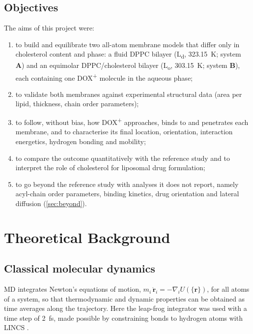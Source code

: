 \documentclass[11pt,a4paper]{article}
\newcommand{\dox}{DOX\textsuperscript{+}}
\newcommand{\sysA}{\textcolor{sysA}{\textbf{A}}}
\newcommand{\sysB}{\textcolor{sysB}{\textbf{B}}}
\newcommand{\Ld}{L\textsubscript{d}}
\newcommand{\Lo}{L\textsubscript{o}}
\begin{document}
\subsection{Objectives}
The aims of this project were:
\begin{enumerate}[label=\arabic*.]
  \item to build and equilibrate two all-atom membrane models that differ only in cholesterol content
        and phase: a fluid DPPC bilayer (\Ld, \SI{323.15}{K}; system \sysA) and an equimolar
        DPPC/cholesterol bilayer (\Lo, \SI{303.15}{K}; system \sysB), each containing one \dox{} molecule
        in the aqueous phase;
  \item to validate both membranes against experimental structural data (area per lipid, thickness,
        chain order parameters);
  \item to follow, without bias, how \dox{} approaches, binds to and penetrates each membrane, and to
        characterise its final location, orientation, interaction energetics, hydrogen bonding and
        mobility;
  \item to compare the outcome quantitatively with the reference study and to interpret the role of
        cholesterol for liposomal drug formulation;
  \item to go beyond the reference study with analyses it does not report, namely acyl-chain order
        parameters, binding kinetics, drug orientation and lateral diffusion (\cref{sec:beyond}).
\end{enumerate}

\section{Theoretical Background}
\label{sec:theory}

\subsection{Classical molecular dynamics}
MD integrates Newton's equations of motion, $m_i\,\ddot{\mathbf r}_i = -\nabla_i U(\{\mathbf r\})$, for
all atoms of a system, so that thermodynamic and dynamic properties can be obtained as time averages along
the trajectory. Here the leap-frog integrator was used with a time step of \SI{2}{fs}, made possible by
constraining bonds to hydrogen atoms with LINCS \cite{hess1997}.
\end{document}
